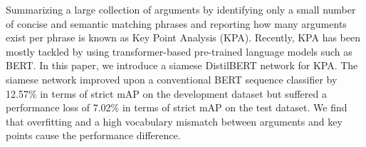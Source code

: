 Summarizing a large collection of arguments by identifying only a small number of concise and semantic matching phrases and reporting how many arguments exist per phrase is known as Key Point Analysis (KPA). Recently, KPA has been mostly tackled by using transformer-based pre-trained language models such as BERT. In this paper, we introduce a siamese DistilBERT network for KPA. The siamese network improved upon a conventional BERT sequence classifier by 12.57\% in terms of strict mAP on the development dataset but suffered a performance loss of 7.02\% in terms of strict mAP on the test dataset. We find that overfitting and a high vocabulary mismatch between arguments and key points cause the performance difference.
